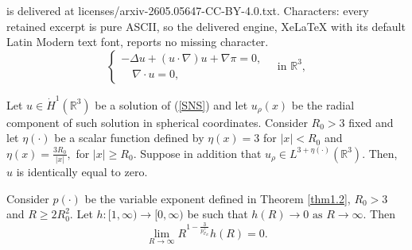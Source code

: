 \documentclass[10pt,a4paper]{amsart}
\def\R{\mathbb{R}}
\def\vu{ u }
\begin{document}
is delivered at licenses/arxiv-2605.05647-CC-BY-4.0.txt. Characters: every retained excerpt is pure ASCII, so the delivered engine, XeLaTeX with its default Latin Modern text font, reports no missing character.
	\begin{equation}\label{SNS}
		\begin{cases}
			-\Delta u+  ( u\cdot \nabla ) u +\nabla \pi  =0,
			\\
			\quad \nabla \cdot u=0, 
		\end{cases}
		\quad 
		\text{in }\R^3,
	\end{equation} 

  \begin{theorem}\label{thm1.2} 
 Let $\vu  \in \dot{H}^1(\mathbb{R}^3) $ be a solution of (\ref{SNS})
 and let $u_\rho(x)$ be the radial component of such solution in spherical coordinates. 
Consider $R_0>3$ fixed  and let $\eta(\cdot)$ be a scalar function defined by  $\eta(x)=  3 $ for $|x|< R_0$ and $\eta(x)=   \frac{3R_0}{|x|},$ for $|x| \geq  R_0$.  
 Suppose in addition that
 $u_\rho \in L^{3 + \eta(\cdot) }(\mathbb{R}^3)$.
 Then, $u $ is identically equal to zero.
\end{theorem} 

\begin{lemma}\label{prop:main_limit_thmover_new}
Consider $p(\cdot)$ be the variable exponent defined in Theorem \ref{thm1.2}, $R_0>3$ and $R\geq 2R_0^2$. Let  
$h:[1,\infty) \to [0,\infty)$ be such that 
$
h(R) \to 0  \text{ as } R \to \infty.
$ 
Then
\[
\lim_{R\to\infty} R^{1 - \frac{3}{p_{\mathcal{C}_R}^+}} h(R) = 0.
\]
\end{lemma}
\end{document}
